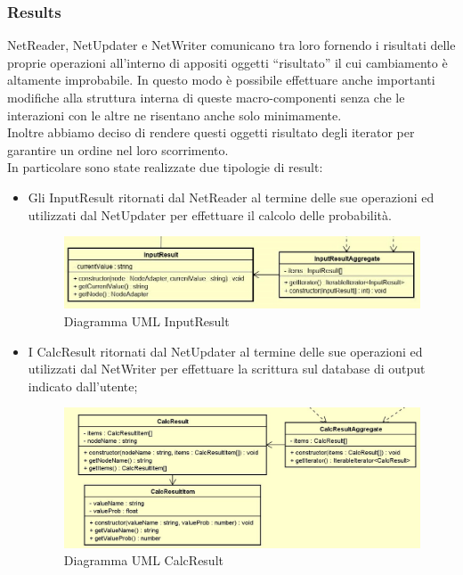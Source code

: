 \subsubsection{Results}
NetReader, NetUpdater e NetWriter comunicano tra loro fornendo i risultati delle proprie operazioni  all'interno di appositi oggetti “risultato” il cui cambiamento è altamente improbabile. In questo modo è possibile effettuare anche importanti modifiche alla struttura interna di queste macro-componenti senza che le interazioni con le altre ne risentano anche solo minimamente.\\
Inoltre abbiamo deciso di rendere questi oggetti risultato degli iterator per garantire un ordine nel loro scorrimento.\\
In particolare sono state realizzate due tipologie di result:
\begin{itemize}
	\item Gli InputResult ritornati dal NetReader al termine delle sue operazioni ed utilizzati dal NetUpdater per effettuare il calcolo delle probabilità.
	\begin{figure} [H]
		\centering
		\includegraphics[scale=0.65]{Img/InputResult}
		\caption{Diagramma UML InputResult}\label{}
	\end{figure}
	\item I CalcResult ritornati dal NetUpdater al termine delle sue operazioni ed utilizzati dal NetWriter per effettuare la scrittura sul database di output indicato dall'utente;
	\begin{figure} [H]
		\centering
		\includegraphics[scale=0.5]{Img/CalcResult}
		\caption{Diagramma UML CalcResult}\label{}
	\end{figure}
\end{itemize}
